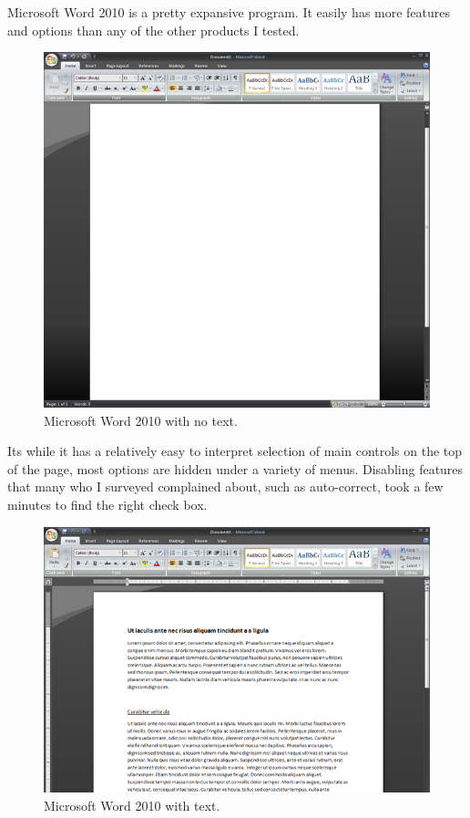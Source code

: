 \documentclass[10pt]{article}
\begin{document}
Microsoft Word 2010 is a pretty expansive program. It easily has more features and options than any of the other products I tested.

\begin{figure}
   \centering
      \includegraphics[width=130mm]{images/BlankWord.png}
   \caption{Microsoft Word 2010 with no text.}
\end{figure}

Its while it has a relatively easy to interpret selection of main controls on the top of the page, most options are hidden under a variety of menus. Disabling features that many who I surveyed complained about, such as auto-correct, took a few minutes to find the right check box.

\begin{figure}
   \centering
      \includegraphics[width=130mm]{images/TextWord.png}
   \caption{Microsoft Word 2010 with text.}
\end{figure}
\end{document}
